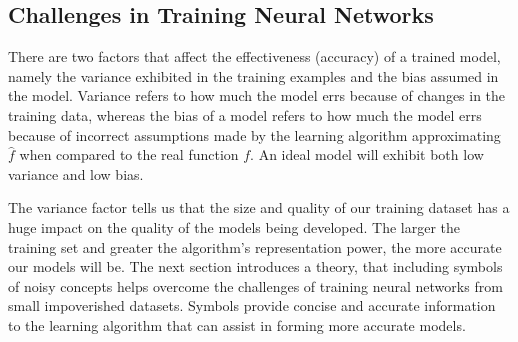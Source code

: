 \subsection{Challenges in Training Neural Networks} \label{sec:introduction-introduction-machine-learning-challenges-training-neural-networks}

There are two factors that affect the effectiveness (accuracy) of a trained model, namely the variance exhibited in the training examples and the bias assumed in the model. Variance refers to how much the model errs because of changes in the training data, whereas the bias of a model refers to how much the model errs because of incorrect assumptions made by the learning algorithm approximating $\hat{f}$ when compared to the real function $f$. An ideal model will exhibit both low variance and low bias\cite{James:2014:ISL:2517747}.

The variance factor tells us that the size and quality of our training dataset has a huge impact on the quality of the models being developed. The larger the training set and greater the algorithm's representation power, the more accurate our models will be\cite{James:2014:ISL:2517747}. The next section introduces a theory, that including symbols of noisy concepts helps overcome the challenges of training neural networks from small impoverished datasets. Symbols provide concise and accurate information to the learning algorithm that can assist in forming more accurate models.